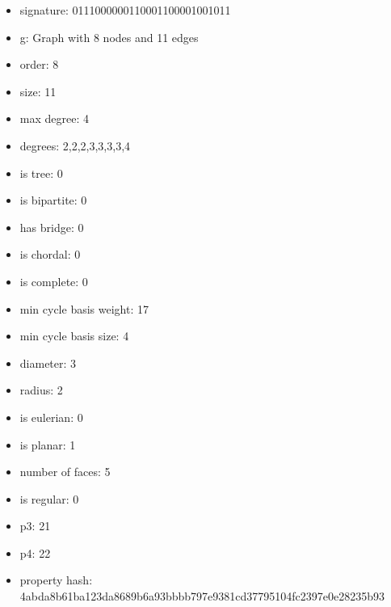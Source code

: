 \begin{itemize}
\item signature: 0111000000110001100001001011
\item g: Graph with 8 nodes and 11 edges
\item order: 8
\item size: 11
\item max degree: 4
\item degrees: 2,2,2,3,3,3,3,4
\item is tree: 0
\item is bipartite: 0
\item has bridge: 0
\item is chordal: 0
\item is complete: 0
\item min cycle basis weight: 17
\item min cycle basis size: 4
\item diameter: 3
\item radius: 2
\item is eulerian: 0
\item is planar: 1
\item number of faces: 5
\item is regular: 0
\item p3: 21
\item p4: 22
\item property hash: 4abda8b61ba123da8689b6a93bbbb797e9381cd37795104fc2397e0e28235b93
\end{itemize}
\newpage
\begin{figure}
\end{figure}
